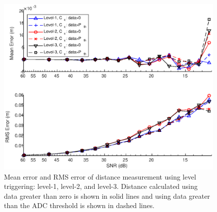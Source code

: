 \begin{figure}[t!p]
\centering
\includegraphics[width=.8\textwidth]{figures/chapter6_ADC/error_snr_level.eps}
\caption{Mean error and RMS error of distance measurement using level triggering: level-1, level-2, and level-3. Distance calculated using data greater than zero is shown in solid lines and using data greater than the ADC threshold is shown in dashed lines.}
\label{fig:bm_error_level}
\end{figure}
